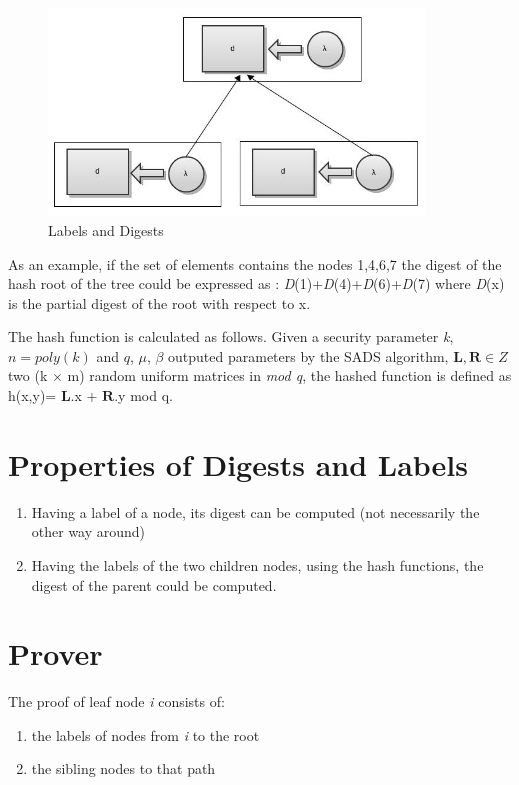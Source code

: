 \documentclass[11pt, letterpaper, oneside]{article}
\begin{document}
        \begin{figure}[h]
        \centering
        \includegraphics[width=100mm]{./images/label_digest.jpg}
        \caption[]{Labels and Digests}
        \end{figure}

	As an example, if the set of elements contains the nodes {1,4,6,7} the digest of the hash root of the tree 
	could be expressed as : \textit{D}(1)+\textit{D}(4)+\textit{D}(6)+\textit{D}(7)
        where \textit{D}(x) is the partial digest of the root with respect to x.
	
	The hash function is calculated as follows. Given a security parameter \textit{k}, $\textit{n} = 
	poly(\textit{k})$ and $\textit{q} $, $\textit{$\mu$}$, $\textit{$\beta$}$ outputed parameters by the SADS 
	algorithm, $\textbf{L}, \textbf{R} \in Z $ two (k $\times$ m) random uniform matrices in \textit{mod q}, the 
	hashed function is defined as h(x,y)= $\textbf{L}$.x + $\textbf{R}$.y mod q.
	
	\section{Properties of Digests and Labels}
	
	\begin{enumerate}
		\item Having a label of a node, its digest can be computed (not necessarily the other way around)
		\item Having the labels of the two children nodes, using the hash functions, the digest of the parent could be computed.
	\end{enumerate}
	
	\section{Prover}
	
	The proof of leaf node \textit{i} consists of: 
	\begin{enumerate}
		\item the labels of nodes from \textit{i} to the root
		\item the sibling nodes to that path
	\end{enumerate}
	
\end{document}
